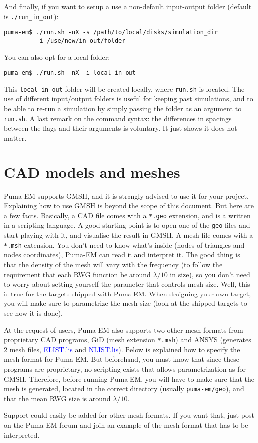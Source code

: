 \documentclass[a4paper,10pt]{book}
\newcommand{\file}[1] {\textcolor{blue}{\textsf{#1}}}
\begin{document}
%
\par
And finally, if you want to setup a use a non-default input-output folder (default is \texttt{./run\_in\_out}):
\begin{verbatim}
puma-em$ ./run.sh -nX -s /path/to/local/disks/simulation_dir 
         -i /use/new/in_out/folder
\end{verbatim}
You can also opt for a local folder:
\begin{verbatim}
puma-em$ ./run.sh -nX -i local_in_out 
\end{verbatim}
This \texttt{local\_in\_out} folder will be created locally, where \texttt{run.sh} is located. The use of different input/output folders is useful for keeping past simulations, and to be able to re-run a simulation by simply passing the folder as an argument to \texttt{run.sh}. A last remark on the command syntax: the differences in spacings between the flags and their arguments is voluntary. It just shows it does not matter.

\section{CAD models and meshes}
%
\par
Puma-EM supports GMSH, and it is strongly advised to use it for your project. Explaining how to use GMSH is beyond the scope of this document. But here are a few facts. Basically, a CAD file comes with a \texttt{*.geo} extension, and is a written in a scripting language. A good starting point is to open one of the \texttt{geo} files and start playing with it, and visualise the result in GMSH. A mesh file comes with a \texttt{*.msh} extension. You don't need to know what's inside (nodes of triangles and nodes coordinates), Puma-EM can read it and interpret it. The good thing is that the density of the mesh will vary with the frequency (to follow the requirement that each RWG function be around $\lambda/10$ in size), so you don't need to worry about setting yourself the parameter that controls mesh size. Well, this is true for the targets shipped with Puma-EM. When designing your own target, you will make sure to parametrize the mesh size (look at the shipped targets to see how it is done).
%
\par
At the request of users, Puma-EM also supports two other mesh formats from proprietary CAD programs, GiD (mesh extension \texttt{*.msh}) and ANSYS (generates 2 mesh files, \file{ELIST.lis} and \file{NLIST.lis}). Below is explained how to specify the mesh format for Puma-EM. But beforehand, you must know that since these programs are proprietary, no scripting exists that allows parametrization as for GMSH. Therefore, before running Puma-EM, you will have to make sure that the mesh is generated, located in the correct directory (usually \texttt{puma-em/geo}), and that the mean RWG size is around $\lambda/10$.
%
\par
Support could easily be added for other mesh formats. If you want that, just post on the Puma-EM forum and join an example of the mesh format that has to be interpreted.
\end{document}
